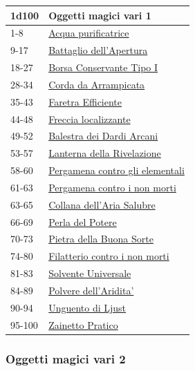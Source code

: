 \begin{multicols}{2}
{{\small\begin{tabularx}{0.45\textwidth}{lX}
		\toprule
\textbf{1d100} & \textbf{Oggetti magici vari 1}\\
\toprule
1-8 & \hyperlink{Acqua purificatrice}{Acqua purificatrice}\\
9-17 & \hyperlink{Battaglio dell'Apertura}{Battaglio dell'Apertura}\\
18-27 & \hyperlink{Borsa Conservante TipoI}{Borsa Conservante Tipo I}\\
28-34 & \hyperlink{Corda da Arrampicata}{Corda da Arrampicata}\\
35-43 & \hyperlink{Faretra Efficiente}{Faretra Efficiente}\\
44-48 & \hyperlink{Freccia localizzante}{Freccia localizzante}\\
49-52 & \hyperlink{Balestra dei Dardi Arcani}{Balestra dei Dardi Arcani}\\
53-57 & \hyperlink{Lanterna della Rivelazione}{Lanterna della Rivelazione}\\
58-60 & \hyperlink{Pergamena contro gli elementali}{Pergamena contro gli elementali}\\
61-63 & \hyperlink{Pergamena contro i nonmorti}{Pergamena contro i non morti}\\
63-65 & \hyperlink{Collana dell'Aria Salubre}{Collana dell'Aria Salubre}\\
66-69 & \hyperlink{Perla del Potere}{Perla del Potere}\\
70-73 & \hyperlink{Pietra della Buona Sorte}{Pietra della Buona Sorte}\\
74-80 & \hyperlink{Filatterio contro i nonmorti}{Filatterio contro i non morti}\\
81-83 & \hyperlink{Solvente Universale}{Solvente Universale}\\
84-89 & \hyperlink{Polvere dell'Aridita'}{Polvere dell'Aridita'}\\
90-94 & \hyperlink{Unguento di Ljust}{Unguento di Ljust}\\
95-100 & \hyperlink{Zainetto Pratico}{Zainetto Pratico}
\end{tabularx}}

\subsubsection{Oggetti magici vari 2}\hypertarget{Oggetti Magici Vari 2}{}

}
\end{multicols}
